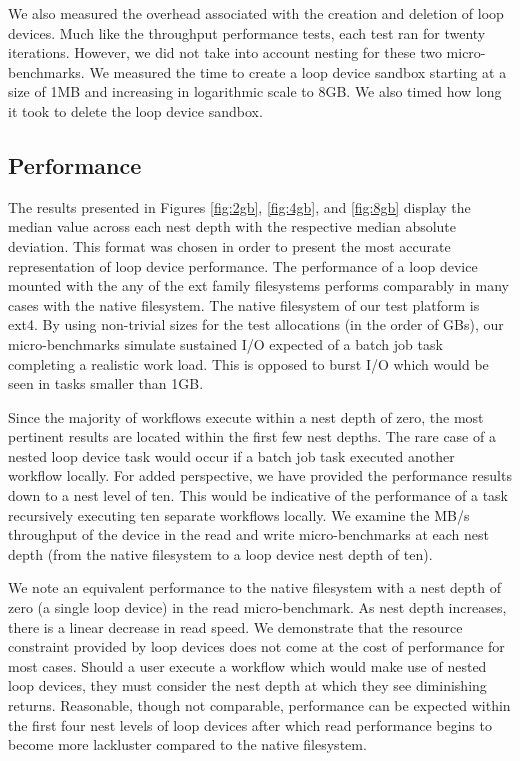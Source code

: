 \documentclass[conference]{IEEEtran}
\begin{document}
We also measured the overhead associated with the creation and deletion of loop devices. Much like the throughput performance tests, each test ran for twenty iterations. However, we did not take into account nesting for these two micro-benchmarks. We measured the time to create a loop device sandbox starting at a size of 1MB and increasing in logarithmic scale to 8GB. We also timed how long it took to delete the loop device sandbox.

\subsection{Performance}
The results presented in Figures \ref{fig:2gb}, \ref{fig:4gb}, and \ref{fig:8gb} display the median value across each nest depth with the respective median absolute deviation. This format was chosen in order to present the most accurate representation of loop device performance. The performance of a loop device mounted with the any of the ext family filesystems performs comparably in many cases with the native filesystem. The native filesystem of our test platform is ext4. By using non-trivial sizes for the test allocations (in the order of GBs), our micro-benchmarks simulate sustained I/O expected of a batch job task completing a realistic work load. This is opposed to burst I/O which would be seen in tasks smaller than 1GB. 

Since the majority of workflows execute within a nest depth of zero, the most pertinent results are located within the first few nest depths. The rare case of a nested loop device task would occur if a batch job task executed another workflow locally. For added perspective, we have provided the performance results down to a nest level of ten. This would be indicative of the performance of a task recursively executing ten separate workflows locally. 
We examine the MB/s throughput of the device in the read and write micro-benchmarks at each nest depth (from the native filesystem to a loop device nest depth of ten).

We note an equivalent performance to the native filesystem with a nest depth of zero (a single loop device) in the read micro-benchmark. As nest depth increases, there is a linear decrease in read speed. We demonstrate that the resource constraint provided by loop devices does not come at the cost of performance for most cases. Should a user execute a workflow which would make use of nested loop devices, they must consider the nest depth at which they see diminishing returns. Reasonable, though not comparable, performance can be expected within the first four nest levels of loop devices after which read performance begins to become more lackluster compared to the native filesystem.
\end{document}
